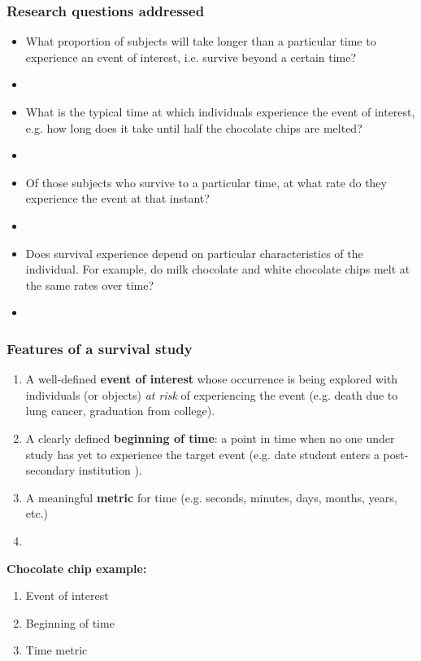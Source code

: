 \begin{frame}
\frametitle{Research questions addressed}
\begin{itemize}
\item \small{What proportion of subjects will take longer than a particular time to experience an event of interest, i.e. survive beyond a certain time?}
\item[]
\item \small{What is the typical time at which individuals experience the event of interest, e.g. how long does it take until half the chocolate chips are melted?}
\item[]
\item \small{Of those subjects who survive to a particular time, at what rate do they experience the event at that instant?}
\item[]
\item \small{Does survival experience depend on particular characteristics of the individual. For example, do milk chocolate and white chocolate chips melt at the same rates over time?}
\item[]
\end{itemize}
\end{frame}


\begin{frame}
\frametitle{Features of a survival study}
\begin{enumerate}
\item A well-defined \textbf{event of interest} whose occurrence is being explored with individuals (or objects) \emph{at risk} of experiencing the event (e.g. death due to lung cancer, graduation from college).
\item A clearly defined \textbf{beginning of time}: a point in time when no one under study has yet to experience the target event (e.g. date student enters a post-secondary institution ).
\item A meaningful \textbf{metric} for time (e.g. seconds, minutes, days, months, years, etc.)
\item[]
\end{enumerate}
\textbf{Chocolate chip example:}
\begin{enumerate}
\item Event of interest  %
\item Beginning of time  %
\item Time metric  %
\end{enumerate}
\end{frame}

